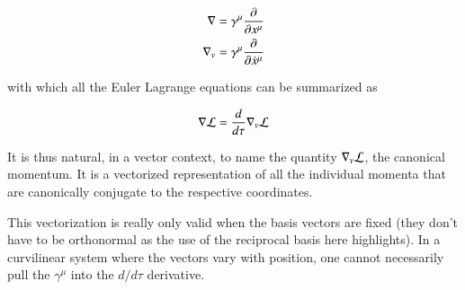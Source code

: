 \begin{align*}
\nabla &= \gamma^\mu \frac{\partial {}}{\partial {x^\mu}} \\
\nabla_v &= \gamma^\mu \frac{\partial {}}{\partial {\dot{x}^\mu}}
\end{align*}

with which all the Euler Lagrange equations can be summarized as

\begin{align*}
\nabla \mathcal{L} = \frac{d}{d\tau} \nabla_v \mathcal{L}
\end{align*}

It is thus natural, in a vector context, to name the quantity $\nabla_v \mathcal{L}$, the canonical momentum.  It is a vectorized representation of all the individual momenta that are canonically conjugate to the respective coordinates.

This vectorization is really only valid when the basis vectors are fixed (they don't have to be orthonormal as the use of the reciprocal basis here highlights).  In a curvilinear system where the vectors vary with position, one cannot necessarily pull the $\gamma^\mu$ into the $d/d\tau$ derivative.


